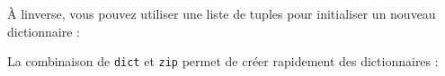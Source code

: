 \begin{Shaded}
\begin{Highlighting}[]
\OperatorTok{\textgreater{}\textgreater{}\textgreater{}}\OperatorTok{=}\NormalTok{ \{}\NormalTok{: }\NormalTok{, }\NormalTok{: }\NormalTok{, }\NormalTok{: }\NormalTok{\}}
\OperatorTok{\textgreater{}\textgreater{}\textgreater{}}\OperatorTok{=} 
\OperatorTok{\textgreater{}\textgreater{}\textgreater{}}
\NormalTok{[(}\NormalTok{, }\NormalTok{), (}\NormalTok{, }\NormalTok{), (}\NormalTok{, }\NormalTok{)]}
\end{Highlighting}
\end{Shaded}

À l\textquotesingle inverse, vous pouvez utiliser une liste de tuples
pour initialiser un nouveau dictionnaire :

\begin{Shaded}
\begin{Highlighting}[]
\OperatorTok{\textgreater{}\textgreater{}\textgreater{}}\OperatorTok{=} \NormalTok{([(}\NormalTok{, }\NormalTok{), (}\NormalTok{, }\NormalTok{), (}\NormalTok{, }\NormalTok{)])}
\OperatorTok{\textgreater{}\textgreater{}\textgreater{}}
\NormalTok{\{}\NormalTok{: }\NormalTok{, }\NormalTok{: }\NormalTok{, }\NormalTok{: }\NormalTok{\}}
\end{Highlighting}
\end{Shaded}

La combinaison de \texttt{dict} et \texttt{zip} permet de créer
rapidement des dictionnaires :

\begin{Shaded}
\begin{Highlighting}[]
\OperatorTok{\textgreater{}\textgreater{}\textgreater{}}\OperatorTok{=} \NormalTok{(}\NormalTok{(}\NormalTok{, }\NormalTok{(}\NormalTok{)))}
\OperatorTok{\textgreater{}\textgreater{}\textgreater{}}
\NormalTok{\{}\NormalTok{: }\NormalTok{, }\NormalTok{: }\NormalTok{, }\NormalTok{: }\NormalTok{\}}
\end{Highlighting}
\end{Shaded}

